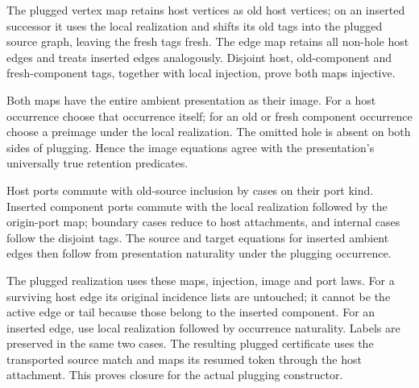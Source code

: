 The plugged vertex map retains host vertices as old host vertices; on an
inserted successor it uses the local realization and shifts its old tags into
the plugged source graph, leaving the fresh tags fresh. The edge map retains
all non-hole host edges and treats inserted edges analogously. Disjoint host,
old-component and fresh-component tags, together with local injection, prove
both maps injective.





Both maps have the entire ambient presentation as their image. For a host
occurrence choose that occurrence itself; for an old or fresh component
occurrence choose a preimage under the local realization. The omitted hole
is absent on both sides of plugging. Hence the image equations agree with
the presentation's universally true retention predicates.



Host ports commute with old-source inclusion by cases on their port kind.
Inserted component ports commute with the local realization followed by the
origin-port map; boundary cases reduce to host attachments, and internal
cases follow the disjoint tags. The source and target equations for inserted
ambient edges then follow from presentation naturality under the plugging
occurrence.





The plugged realization uses these maps, injection, image and port laws.
For a surviving host edge its original incidence lists are untouched; it cannot
be the active edge or tail because those belong to the inserted component.
For an inserted edge, use local realization followed by occurrence naturality.
Labels are preserved in the same two cases. The resulting plugged certificate
uses the transported source match and maps its resumed token through the host
attachment. This proves closure for the actual plugging constructor.

